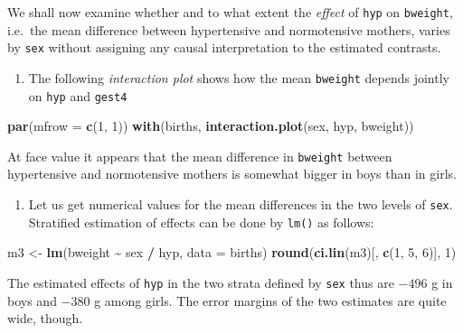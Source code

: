 \documentclass[
]{book}
\newenvironment{Shaded}{\begin{snugshade}}{\end{snugshade}}
\newcommand{\AttributeTok}[1]{\textcolor[rgb]{0.13,0.29,0.53}{#1}}
\newcommand{\DecValTok}[1]{\textcolor[rgb]{0.00,0.00,0.81}{#1}}
\newcommand{\FunctionTok}[1]{\textcolor[rgb]{0.13,0.29,0.53}{\textbf{#1}}}
\newcommand{\NormalTok}[1]{#1}
\newcommand{\OtherTok}[1]{\textcolor[rgb]{0.56,0.35,0.01}{#1}}
\newcommand{\SpecialCharTok}[1]{\textcolor[rgb]{0.81,0.36,0.00}{\textbf{#1}}}
\providecommand{\tightlist}{%
  \setlength{\itemsep}{0pt}\setlength{\parskip}{0pt}}
\begin{document}
We shall now examine whether and to what extent the
\emph{effect} of \texttt{hyp} on \texttt{bweight}, i.e.~the
mean difference between hypertensive and normotensive mothers,
varies by \texttt{sex} without assigning
any causal interpretation to the estimated contrasts.

\begin{enumerate}
\def\labelenumi{\arabic{enumi}.}
\tightlist
\item
  The following \emph{interaction plot}
  shows how the mean \texttt{bweight} depends jointly on \texttt{hyp} and \texttt{gest4}
\end{enumerate}

\begin{Shaded}
\begin{Highlighting}[]
\FunctionTok{par}\NormalTok{(}\AttributeTok{mfrow =} \FunctionTok{c}\NormalTok{(}\DecValTok{1}\NormalTok{, }\DecValTok{1}\NormalTok{))}
\FunctionTok{with}\NormalTok{(births, }\FunctionTok{interaction.plot}\NormalTok{(sex, hyp, bweight))}
\end{Highlighting}
\end{Shaded}

At face value it appears that the mean difference in \texttt{bweight} between
hypertensive and normotensive
mothers is somewhat bigger in boys than in girls.

\begin{enumerate}
\def\labelenumi{\arabic{enumi}.}
\setcounter{enumi}{1}
\tightlist
\item
  Let us get numerical values for the mean differences
  in the two levels of \texttt{sex}.
  Stratified estimation of effects can be done by \texttt{lm()} as follows:
\end{enumerate}

\begin{Shaded}
\begin{Highlighting}[]
\NormalTok{m3 }\OtherTok{\textless{}{-}} \FunctionTok{lm}\NormalTok{(bweight }\SpecialCharTok{\textasciitilde{}}\NormalTok{ sex }\SpecialCharTok{/}\NormalTok{ hyp, }\AttributeTok{data =}\NormalTok{ births)}
\FunctionTok{round}\NormalTok{(}\FunctionTok{ci.lin}\NormalTok{(m3)[, }\FunctionTok{c}\NormalTok{(}\DecValTok{1}\NormalTok{, }\DecValTok{5}\NormalTok{, }\DecValTok{6}\NormalTok{)], }\DecValTok{1}\NormalTok{)}
\end{Highlighting}
\end{Shaded}

The estimated effects of \texttt{hyp} in the two strata defined by \texttt{sex} thus
are \(-496\) g in boys and \(-380\) g among girls.
The error margins of the two estimates are quite wide, though.
\end{document}
